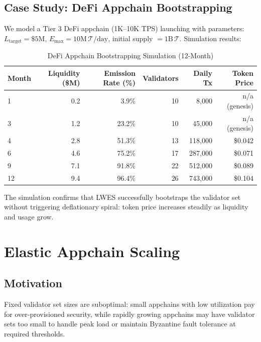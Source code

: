 \documentclass[11pt]{article}
\begin{document}
\subsection{Case Study: DeFi Appchain Bootstrapping}

We model a Tier 3 DeFi appchain (1K--10K TPS) launching with parameters:
$L_{\text{target}} = \$5\text{M}$, $E_{\max} = 10\text{M}\,\mathcal{T}/\text{day}$,
initial supply $= 1\text{B}\,\mathcal{T}$. Simulation results:

\begin{table}[H]
\centering
\caption{DeFi Appchain Bootstrapping Simulation (12-Month)}
\label{tab:bootstrap_sim}
\begin{tabular}{lrrrrr}
\toprule
\textbf{Month} & \textbf{Liquidity (\$M)} & \textbf{Emission Rate (\%)} & \textbf{Validators} & \textbf{Daily Tx} & \textbf{Token Price} \\
\midrule
1 & 0.2 & 3.9\% & 10 & 8,000 & n/a (genesis) \\
3 & 1.2 & 23.2\% & 10 & 45,000 & n/a (genesis) \\
4 & 2.8 & 51.3\% & 13 & 118,000 & \$0.042 \\
6 & 4.6 & 75.2\% & 17 & 287,000 & \$0.071 \\
9 & 7.1 & 91.8\% & 22 & 512,000 & \$0.089 \\
12 & 9.4 & 96.4\% & 26 & 743,000 & \$0.104 \\
\bottomrule
\end{tabular}
\end{table}

The simulation confirms that LWES successfully bootstraps the validator set without
triggering deflationary spiral: token price increases steadily as liquidity and usage grow.

\section{Elastic Appchain Scaling}
\label{sec:elastic}

\subsection{Motivation}

Fixed validator set sizes are suboptimal: small appchains with low utilization pay for
over-provisioned security, while rapidly growing appchains may have validator sets too
small to handle peak load or maintain Byzantine fault tolerance at required thresholds.
\end{document}
